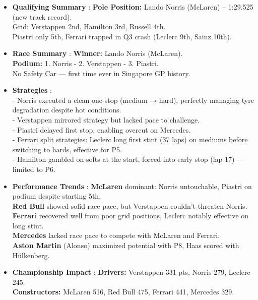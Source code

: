\begin{itemize}
    \item \textbf{Qualifying Summary} : \textbf{Pole Position:} Lando Norris (McLaren) – 1:29.525 (new track record). \\
    Grid: Verstappen 2nd, Hamilton 3rd, Russell 4th. \\
    Piastri only 5th, Ferrari trapped in Q3 crash (Leclerc 9th, Sainz 10th).
    
    \item \textbf{Race Summary} : \textbf{Winner:} Lando Norris (McLaren). \\
    \textbf{Podium:} 1. Norris - 2. Verstappen - 3. Piastri. \\
    No Safety Car — first time ever in Singapore GP history. 
    
    \item \textbf{Strategies} : \\ 
    - Norris executed a clean one-stop (medium → hard), perfectly managing tyre degradation despite hot conditions. \\
    - Verstappen mirrored strategy but lacked pace to challenge. \\
    - Piastri delayed first stop, enabling overcut on Mercedes. \\
    - Ferrari split strategies: Leclerc long first stint (37 laps) on mediums before switching to hards, effective for P5. \\
    - Hamilton gambled on softs at the start, forced into early stop (lap 17) — limited to P6. 
    
    \item \textbf{Performance Trends} : \textbf{McLaren} dominant: Norris untouchable, Piastri on podium despite starting 5th. \\
    \textbf{Red Bull} showed solid race pace, but Verstappen couldn’t threaten Norris. \\
    \textbf{Ferrari} recovered well from poor grid positions, Leclerc notably effective on long stint. \\
    \textbf{Mercedes} lacked race pace to compete with McLaren and Ferrari. \\
    \textbf{Aston Martin} (Alonso) maximized potential with P8, Haas scored with Hülkenberg.
    
    \item \textbf{Championship Impact} : \textbf{Drivers:} Verstappen 331 pts, Norris 279, Leclerc 245. \\
    \textbf{Constructors:} McLaren 516, Red Bull 475, Ferrari 441, Mercedes 329.
\end{itemize}

